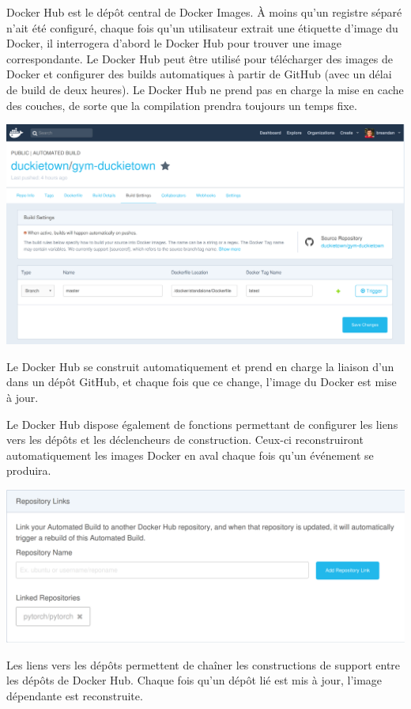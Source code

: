 {Docker Hub est le dépôt central de Docker Images. À moins qu'un registre séparé n'ait été configuré, chaque fois qu'un utilisateur extrait une étiquette d'image du Docker, il interrogera d'abord le Docker Hub pour trouver une image correspondante. Le Docker Hub peut être utilisé pour télécharger des images de Docker et configurer des builds automatiques à partir de GitHub (avec un délai de build de deux heures). Le Docker Hub ne prend pas en charge la mise en cache des couches, de sorte que la compilation prendra toujours un temps fixe.
%
\begin{centering}
\includegraphics[width=\textwidth]{../figures/docker_hub_autobuild.png}
\end{centering}
%
Le Docker Hub se construit automatiquement et prend en charge la liaison d'un  dans un dépôt GitHub, et chaque fois que ce  change, l'image du Docker est mise à jour.

Le Docker Hub dispose également de fonctions permettant de configurer les liens vers les dépôts et les déclencheurs de construction. Ceux-ci reconstruiront automatiquement les images Docker en aval chaque fois qu'un événement se produira.\vspace{10pt}
%
\begin{centering}
\includegraphics[width=\textwidth]{../figures/docker_hub_repo_links.png}
\end{centering}
%
Les liens vers les dépôts permettent de chaîner les constructions de support entre les dépôts de Docker Hub. Chaque fois qu'un dépôt lié est mis à jour, l'image dépendante est reconstruite.

}
